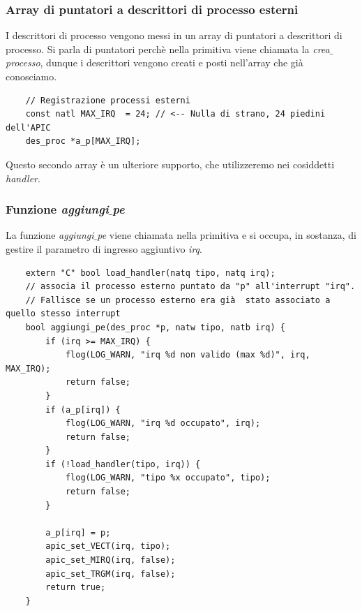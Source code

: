 \subsubsection{Array di puntatori a descrittori di processo esterni}
I descrittori di processo vengono messi in un array di puntatori a descrittori di processo. Si parla di puntatori perchè nella primitiva viene chiamata la \emph{crea$\_$processo}, dunque i descrittori vengono creati e posti nell'array che già conosciamo. 
\begin{verbatim}
	// Registrazione processi esterni
	const natl MAX_IRQ  = 24; // <-- Nulla di strano, 24 piedini dell'APIC	
	des_proc *a_p[MAX_IRQ];
\end{verbatim}Questo secondo array è un ulteriore supporto, che utilizzeremo nei cosiddetti \emph{handler}.
\subsubsection{Funzione \emph{aggiungi$\_$pe}}
La funzione \emph{aggiungi$\_$pe} viene chiamata nella primitiva e si occupa, in sostanza, di gestire il parametro di ingresso aggiuntivo \emph{irq}.
\small
\begin{verbatim}
	extern "C" bool load_handler(natq tipo, natq irq);
	// associa il processo esterno puntato da "p" all'interrupt "irq".
	// Fallisce se un processo esterno era già  stato associato a quello stesso interrupt
	bool aggiungi_pe(des_proc *p, natw tipo, natb irq) {
		if (irq >= MAX_IRQ) {
			flog(LOG_WARN, "irq %d non valido (max %d)", irq, MAX_IRQ);
			return false;
		}
		if (a_p[irq]) {
			flog(LOG_WARN, "irq %d occupato", irq);
			return false;
		}
		if (!load_handler(tipo, irq)) {
			flog(LOG_WARN, "tipo %x occupato", tipo);
			return false;
		}
		
		a_p[irq] = p;
		apic_set_VECT(irq, tipo);
		apic_set_MIRQ(irq, false);
		apic_set_TRGM(irq, false);
		return true;
	}
\end{verbatim}
\normalsize 
